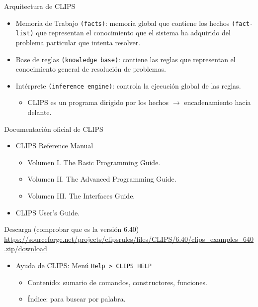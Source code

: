 \documentclass[usenames,dvipsnames,aspectratio=169]{beamer}
\begin{document}
\begin{frame}{Arquitectura de CLIPS}
	\begin{itemize}
		\item Memoria de Trabajo \texttt{(facts)}: memoria global que contiene los hechos \texttt{(fact-list)} que representan el conocimiento que el sistema ha adquirido del problema particular que intenta resolver.
		\item Base de reglas \texttt{(knowledge base)}: contiene las reglas que representan el conocimiento general de resolución de problemas.
		\item Intérprete \texttt{(inference engine)}: controla la ejecución global de las reglas.
		\begin{itemize}
			\item CLIPS es un programa dirigido por los hechos $\rightarrow$ encadenamiento hacia delante.
		\end{itemize}
	\end{itemize}
\end{frame}

\begin{frame}{Documentación oficial de CLIPS}
	\begin{itemize}
		\item CLIPS Reference Manual
		\begin{itemize}
			\item Volumen I. The Basic Programming Guide.
			\item Volumen II. The Advanced Programming Guide.
			\item Volumen III. The Interfaces Guide.
		\end{itemize}
		\item CLIPS User's Guide.
	\end{itemize}
	\begin{block}{Descarga (comprobar que es la versión 6.40)}
		\url{https://sourceforge.net/projects/clipsrules/files/CLIPS/6.40/clips_examples_640.zip/download}
	\end{block}
	\begin{itemize}
		\item Ayuda de CLIPS: Menú \texttt{Help > CLIPS HELP}
		\begin{itemize}
			\item Contenido: sumario de comandos, constructores, funciones.
			\item Índice: para buscar por palabra.
		\end{itemize}
	\end{itemize}
\end{frame}
\end{document}

